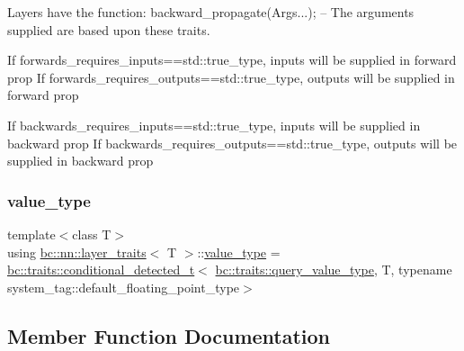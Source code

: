 Layers have the function\+: backward\+\_\+propagate(Args...); -- The arguments supplied are based upon these traits. 

If forwards\+\_\+requires\+\_\+inputs==std\+::true\+\_\+type, inputs will be supplied in forward prop If forwards\+\_\+requires\+\_\+outputs==std\+::true\+\_\+type, outputs will be supplied in forward prop

If backwards\+\_\+requires\+\_\+inputs==std\+::true\+\_\+type, inputs will be supplied in backward prop If backwards\+\_\+requires\+\_\+outputs==std\+::true\+\_\+type, outputs will be supplied in backward prop \mbox{\label{structbc_1_1nn_1_1layer__traits_a998c8708310306546aa5edb3ad1b46b8}} 
\subsubsection{\texorpdfstring{value\+\_\+type}{value\_type}}
{\footnotesize\ttfamily template$<$class T$>$ \\
using \hyperlink{structbc_1_1nn_1_1layer__traits}{bc\+::nn\+::layer\+\_\+traits}$<$ T $>$\+::\hyperlink{structbc_1_1nn_1_1layer__traits_a998c8708310306546aa5edb3ad1b46b8}{value\+\_\+type} =  \hyperlink{namespacebc_1_1traits_a1a6d378947ec32acd457890854bcd592}{bc\+::traits\+::conditional\+\_\+detected\+\_\+t}$<$ \hyperlink{namespacebc_1_1traits_a40b9437a2ec1bb34ee7d506c8053f906}{bc\+::traits\+::query\+\_\+value\+\_\+type}, T, typename system\+\_\+tag\+::default\+\_\+floating\+\_\+point\+\_\+type$>$}



\subsection{Member Function Documentation}
\mbox{\label{structbc_1_1nn_1_1layer__traits_abcbd25ae68c8b16363005cee09696142}} 
